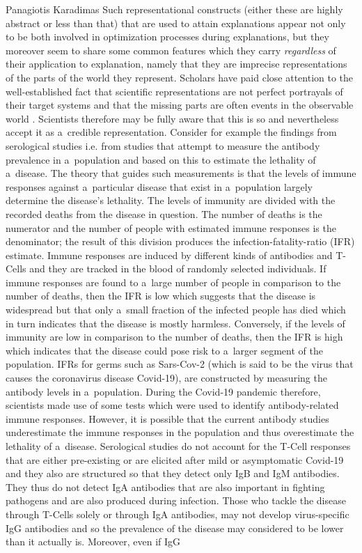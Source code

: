 \begin{artengenv}{Panagiotis Karadimas}
Such representational constructs (either these are highly abstract or less than that) that are used to attain explanations appear not only to be both involved in optimization processes during explanations, but they moreover seem to share some common features which they carry \textit{regardless} of their application to explanation, namely that they are imprecise representations of the parts of the world they represent. Scholars have paid close attention to the well-established fact that scientific representations are not perfect portrayals of their target systems
\parencite[][]{frigg_models_2017} %
 and that the missing parts are often events in the observable world 
\parencite[][]{batterman_specialness_2007}. %
 Scientists therefore may be fully aware that this is so and nevertheless accept it as a~credible representation. Consider for example the findings from serological studies i.e. from studies that attempt to measure the antibody prevalence in a~population and based on this to estimate the lethality of a~disease. The theory that guides such measurements is that the levels of immune responses against a~particular disease that exist in a~population largely determine the disease's lethality. The levels of immunity are divided with the recorded deaths from the disease in question. The number of deaths is the numerator and the number of people with estimated immune responses is the denominator; the result of this division produces the infection-fatality-ratio (IFR) estimate. Immune responses are induced by different kinds of antibodies and T-Cells and they are tracked in the blood of randomly selected individuals. If immune responses are found to a~large number of people in comparison to the number of deaths, then the IFR is low which suggests that the disease is widespread but that only a~small fraction of the infected people has died which in turn indicates that the disease is mostly harmless. Conversely, if the levels of immunity are low in comparison to the number of deaths, then the IFR is high which indicates that the disease could pose risk to a~larger segment of the population. IFRs for germs such as Sars-Cov-2 (which is said to be the virus that causes the coronavirus disease Covid-19), are constructed by measuring the antibody levels in a~population. During the Covid-19 pandemic therefore, scientists made use of some tests which were used to identify antibody-related immune responses. However, it is possible that the current antibody studies underestimate the immune responses in the population and thus overestimate the lethality of a~disease. Serological studies do not account for the T-Cell responses that are either pre-existing or are elicited after mild or asymptomatic Covid-19 and they also are structured so that they detect only IgB and IgM antibodies. They thus do not detect IgA antibodies that are also important in fighting pathogens and are also produced during infection. Those who tackle the disease through T-Cells solely or through IgA antibodies, may not develop virus-specific IgG antibodies and so the prevalence of the disease may considered to be lower than it actually is. Moreover, even if IgG 
\end{artengenv}
